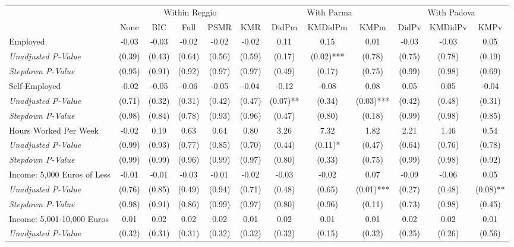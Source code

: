 \begin{tabular}{l c c c c c c c c c c c}
\toprule
& \multicolumn{5}{c}{Within Reggio} & \multicolumn{3}{c}{With Parma} & \multicolumn{3}{c}{With Padova} \\\cmidrule(lr){2-6} \cmidrule(lr){7-9} \cmidrule(lr){10-12}
 & None & BIC & Full & PSMR & KMR & DidPm & KMDidPm & KMPm & DidPv & KMDidPv & KMPv \\
\midrule
Employed & -0.03 & -0.03 & -0.02 & -0.02 & -0.02 & 0.11 & 0.15 & 0.01 & -0.03 & -0.03 & 0.05 \\
\quad \textit{Unadjusted P-Value} & (0.39) & (0.43) & (0.64) & (0.56) & (0.59) & (0.17) & (0.02)*** & (0.78) & (0.75) & (0.78) & (0.19) \\
\quad \textit{Stepdown P-Value} & (0.95) & (0.91) & (0.92) & (0.97) & (0.97) & (0.49) & (0.17) & (0.75) & (0.99) & (0.98) & (0.69) \\
Self-Employed & -0.02 & -0.05 & -0.06 & -0.05 & -0.04 & -0.12 & -0.08 & 0.08 & 0.05 & 0.05 & -0.04 \\
\quad \textit{Unadjusted P-Value} & (0.71) & (0.32) & (0.31) & (0.42) & (0.47) & (0.07)** & (0.34) & (0.03)*** & (0.42) & (0.48) & (0.31) \\
\quad \textit{Stepdown P-Value} & (0.98) & (0.84) & (0.78) & (0.93) & (0.96) & (0.47) & (0.80) & (0.18) & (0.99) & (0.98) & (0.85) \\
Hours Worked Per Week & -0.02 & 0.19 & 0.63 & 0.64 & 0.80 & 3.26 & 7.32 & 1.82 & 2.21 & 1.46 & 0.54 \\
\quad \textit{Unadjusted P-Value} & (0.99) & (0.93) & (0.77) & (0.85) & (0.70) & (0.44) & (0.11)* & (0.47) & (0.64) & (0.76) & (0.78) \\
\quad \textit{Stepdown P-Value} & (0.99) & (0.99) & (0.96) & (0.99) & (0.97) & (0.80) & (0.33) & (0.75) & (0.99) & (0.98) & (0.92) \\
Income: 5,000 Euros of Less & -0.01 & -0.01 & -0.03 & -0.01 & -0.02 & -0.03 & -0.02 & 0.07 & -0.09 & -0.06 & 0.05 \\
\quad \textit{Unadjusted P-Value} & (0.76) & (0.85) & (0.49) & (0.94) & (0.71) & (0.48) & (0.65) & (0.01)*** & (0.27) & (0.48) & (0.08)** \\
\quad \textit{Stepdown P-Value} & (0.98) & (0.91) & (0.86) & (0.99) & (0.97) & (0.80) & (0.96) & (0.11) & (0.73) & (0.98) & (0.45) \\
Income: 5,001-10,000 Euros & 0.01 & 0.02 & 0.02 & 0.02 & 0.01 & 0.02 & 0.01 & 0.01 & 0.02 & 0.02 & 0.01 \\
\quad \textit{Unadjusted P-Value} & (0.32) & (0.31) & (0.31) & (0.32) & (0.32) & (0.32) & (0.15) & (0.32) & (0.25) & (0.26) & (0.56) \\

\end{tabular}
